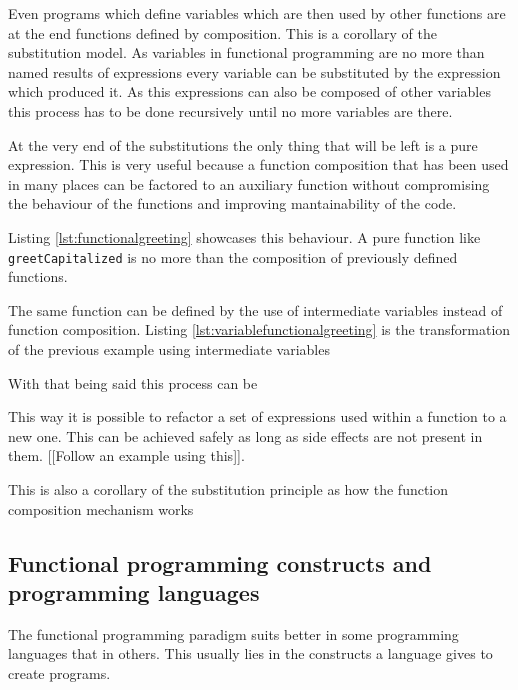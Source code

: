\documentclass[../main.tex]{subfiles}
\begin{document}
Even programs which define variables which are then used by other functions are
at the end functions defined by composition. This is a corollary of the
substitution model. As variables in functional programming are no more than
named results of expressions every variable can be substituted by the expression
which produced it. As this expressions can also be composed of other variables
this process has to be done recursively until no more variables are there.

At the very end of the substitutions the only thing that will be left is a pure
expression. This is very useful because a function composition that has been
used in many places can be factored to an auxiliary function without
compromising the behaviour of the functions and improving mantainability of the
code.

Listing \ref{lst:functionalgreeting} showcases this behaviour. A pure function
like \texttt{greetCapitalized} is no more than the composition of previously defined
functions.



The same function can be defined by the use of intermediate variables instead of
function composition. Listing \ref{lst:variablefunctionalgreeting} is the
transformation of the previous example using intermediate variables



With that being said this process can be

This way it is possible to refactor a set of expressions used within a function
to a new one. This can be achieved safely as long as side effects are not
present in them. [[Follow an example using this]].

This is also a corollary of the substitution principle as how the function
composition mechanism works

\subsection{Functional programming constructs and programming languages} The
functional programming paradigm suits better in some programming languages that
in others. This usually lies in the constructs a language gives to create
programs.
\end{document}
